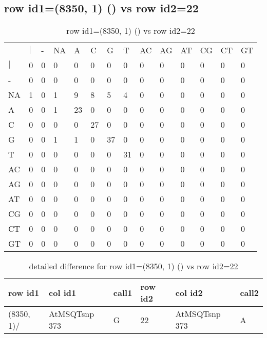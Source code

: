 \subsection{row id1=(8350, 1) () vs row id2=22}
\begin{center}
\begin{longtable}{|l|l|l|l|l|l|l|l|l|l|l|l|l|l|}
\caption{row id1=(8350, 1) () vs row id2=22} \label{table_dm566}\\
\hline
\\
\hline
&$|$&-&NA&A&C&G&T&AC&AG&AT&CG&CT&GT\\
$|$&0&0&0&0&0&0&0&0&0&0&0&0&0\\
-&0&0&0&0&0&0&0&0&0&0&0&0&0\\
NA&1&0&1&9&8&5&4&0&0&0&0&0&0\\
A&0&0&1&23&0&0&0&0&0&0&0&0&0\\
C&0&0&0&0&27&0&0&0&0&0&0&0&0\\
G&0&0&1&1&0&37&0&0&0&0&0&0&0\\
T&0&0&0&0&0&0&31&0&0&0&0&0&0\\
AC&0&0&0&0&0&0&0&0&0&0&0&0&0\\
AG&0&0&0&0&0&0&0&0&0&0&0&0&0\\
AT&0&0&0&0&0&0&0&0&0&0&0&0&0\\
CG&0&0&0&0&0&0&0&0&0&0&0&0&0\\
CT&0&0&0&0&0&0&0&0&0&0&0&0&0\\
GT&0&0&0&0&0&0&0&0&0&0&0&0&0\\
\hline
\end{longtable}
\end{center}

\begin{center}
\begin{longtable}{|l|l|l|l|l|l|}
\caption{detailed difference for row id1=(8350, 1) () vs row id2=22} \label{table_dm567}\\
\hline
row id1&col id1&call1&row id2&col id2&call2\\
\hline
(8350, 1)/&AtMSQTsnp 373&G&22&AtMSQTsnp 373&A\\
\hline
\end{longtable}
\end{center}

